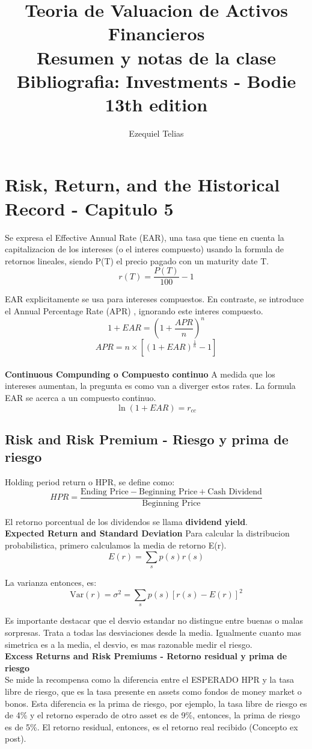 \documentclass{article}
\title{
    \textbf{Teoria de Valuacion de Activos Financieros} \\ 
    Resumen y notas de la clase
    \\
    \small Bibliografia: Investments - Bodie 13th edition
}
\author{Ezequiel Telias}
\date{}
\begin{document}
\maketitle


\section{Risk, Return, and the Historical Record - Capitulo 5}
Se expresa el Effective Annual Rate  (EAR), una tasa que tiene en cuenta la capitalizacion de los intereses (o el interes compuesto)
 usando la formula de retornos lineales, siendo P(T) el precio pagado con un maturity date T.
\[
r(T) = \frac{P(T)}{100} - 1
\]

EAR explicitamente se usa para intereses compuestos. En contraste, se introduce el Annual Percentage Rate (APR)
, ignorando este interes compuesto. 
\[
1 + EAR = \left(1 + \frac{APR}{n}\right)^{n}
\]
\[
APR = n \times \left[(1 + EAR)^{\frac{1}{n}} - 1\right]
\]
\\
\textbf{Continuous Compunding o Compuesto continuo}
A medida que los intereses aumentan, la pregunta es como van a diverger estos rates. La formula EAR se acerca a un 
compuesto continuo.
\[
\ln(1 + EAR) = r_{cc}
\]

\subsection{Risk and Risk Premium - Riesgo y prima de riesgo}
Holding period return o HPR, se define como: 
\[
HPR = \frac{\text{Ending Price} - \text{Beginning Price} + \text{Cash Dividend}}{\text{Beginning Price}}
\]

El retorno porcentual de los dividendos se llama \textbf{dividend yield}.
\\

\textbf{Expected Return and Standard Deviation}
Para calcular la distribucion probabilistica, primero calculamos la media de retorno E(r).
\[
E(r) = \sum_{s} p(s) r(s)
\]

La varianza entonces, es:
\[
\mathrm{Var}(r) = \sigma^{2} = \sum_{s} p(s) \left[r(s) - E(r)\right]^{2}
\]


Es importante destacar que el desvio estandar no distingue entre buenas o malas sorpresas. Trata a todas las desviaciones
desde la media. Igualmente cuanto mas simetrica es a la media, el desvio, es mas razonable medir el riesgo.
\\

\textbf{Excess Returns and Risk Premiums - Retorno residual y prima de riesgo}
\\
Se mide la recompensa como la diferencia entre el ESPERADO HPR y la tasa libre de riesgo, que es la tasa presente en
assets como fondos de money market o bonos. Esta diferencia es la prima de riesgo, por ejemplo, la tasa libre de riesgo
 es de 4\% y el retorno esperado de otro asset es de 9\%, entonces, la prima de riesgo es de 5\%.  El retorno residual, entonces, es el retorno
 real recibido (Concepto ex post). 
\\
\end{document}
